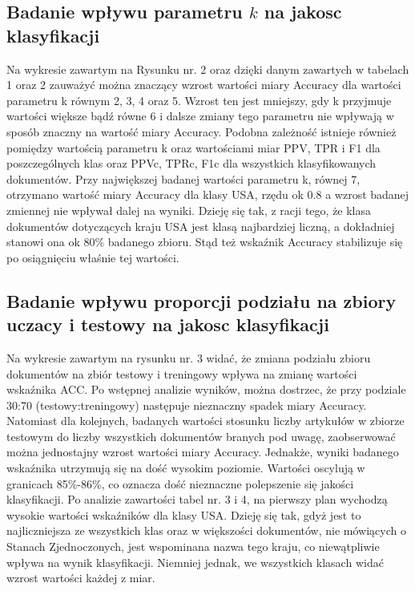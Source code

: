 \documentclass{classrep}
\begin{document}
\subsection{Badanie wpływu parametru $k$ na jakosc klasyfikacji}
Na wykresie zawartym na Rysunku nr. 2 oraz dzięki danym zawartych w tabelach 1 oraz 2 zauważyć można znaczący wzrost wartości miary Accuracy dla wartości parametru k równym 2, 3, 4 oraz 5. Wzrost ten jest mniejszy, gdy k przyjmuje wartości większe bądź równe 6 i dalsze zmiany tego parametru nie wpływają w sposób znaczny na wartość miary Accuracy. Podobna zależność istnieje również pomiędzy wartością parametru k oraz wartościami miar PPV, TPR i F1 dla poszczególnych klas oraz PPVc, TPRc, F1c dla wszystkich klasyfikowanych dokumentów. Przy największej badanej wartości parametru k, równej 7, otrzymano wartość miary Accuracy dla klasy USA, rzędu ok 0.8 a wzrost badanej zmiennej nie wpływał dalej na wyniki. Dzieję się tak, z racji tego, że klasa dokumentów dotyczących kraju USA jest klasą najbardziej liczną, a dokładniej stanowi ona ok 80\% badanego zbioru. Stąd też wskaźnik Accuracy stabilizuje się po osiągnięciu właśnie tej wartości.
\\
\subsection{Badanie wpływu proporcji podziału na zbiory uczacy i testowy na jakosc klasyfikacji}
Na wykresie zawartym na rysunku nr. 3 widać, że zmiana podziału zbioru dokumentów na zbiór testowy i treningowy wpływa na zmianę wartości wskaźnika ACC. Po wstępnej analizie wyników, można dostrzec, że przy podziale 30:70 (testowy:treningowy) następuje nieznaczny spadek miary Accuracy. Natomiast dla kolejnych, badanych wartości stosunku liczby artykułów w zbiorze testowym do liczby wszystkich dokumentów branych pod uwagę, zaobserwować można jednostajny wzrost wartości miary Accuracy. Jednakże, wyniki badanego wskaźnika utrzymują się na dość wysokim poziomie. Wartości oscylują w granicach 85\%-86\%, co oznacza dość nieznaczne polepszenie się jakości klasyfikacji. Po analizie zawartości tabel nr. 3 i 4, na pierwszy plan wychodzą wysokie wartości wskaźników dla klasy USA. Dzieję się tak, gdyż jest to najliczniejsza ze wszystkich klas oraz w większości dokumentów, nie mówiących o Stanach Zjednoczonych, jest wspominana nazwa tego kraju, co niewątpliwie wpływa na wynik klasyfikacji. Niemniej jednak, we wszystkich klasach widać wzrost wartości każdej z miar.
\\
\end{document}
